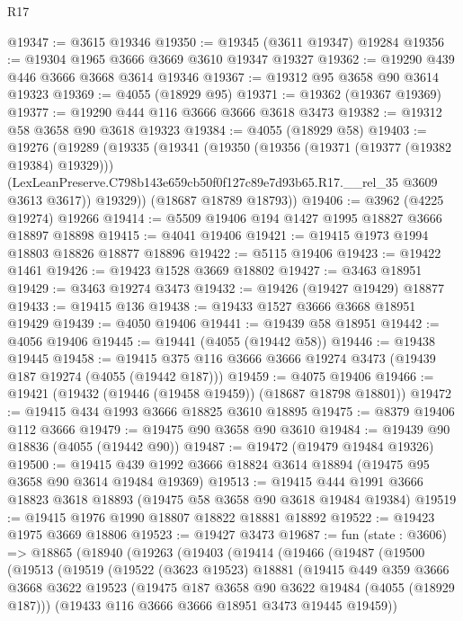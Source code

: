 \begin{lexlean}{R17}
\begin{coremodule}
@19347 := @3615 @19346
@19350 := @19345 (@3611 @19347) @19284
@19356 := @19304 @1965 @3666 @3669 @3610 @19347 @19327
@19362 := @19290 @439 @446 @3666 @3668 @3614 @19346
@19367 := @19312 @95 @3658 @90 @3614 @19323
@19369 := @4055 (@18929 @95)
@19371 := @19362 (@19367 @19369)
@19377 := @19290 @444 @116 @3666 @3666 @3618 @3473
@19382 := @19312 @58 @3658 @90 @3618 @19323
@19384 := @4055 (@18929 @58)
@19403 := @19276
    (@19289
      (@19335
        (@19341
          (@19350
            (@19356 (@19371 (@19377 (@19382 @19384) @19329)))
            (LexLeanPreserve.C798b143e659cb50f0f127c89e7d93b65.R17.__rel_35 @3609 @3613 @3617))
          @19329))
      (@18687 @18789 @18793))
@19406 := @3962 (@4225 @19274) @19266
@19414 := @5509 @19406 @194 @1427 @1995 @18827 @3666 @18897 @18898
@19415 := @4041 @19406
@19421 := @19415 @1973 @1994 @18803 @18826 @18877 @18896
@19422 := @5115 @19406
@19423 := @19422 @1461
@19426 := @19423 @1528 @3669 @18802
@19427 := @3463 @18951
@19429 := @3463 @19274 @3473
@19432 := @19426 (@19427 @19429) @18877
@19433 := @19415 @136
@19438 := @19433 @1527 @3666 @3668 @18951 @19429
@19439 := @4050 @19406
@19441 := @19439 @58 @18951
@19442 := @4056 @19406
@19445 := @19441 (@4055 (@19442 @58))
@19446 := @19438 @19445
@19458 := @19415 @375 @116 @3666 @3666 @19274 @3473 (@19439 @187 @19274 (@4055 (@19442 @187)))
@19459 := @4075 @19406
@19466 := @19421 (@19432 (@19446 (@19458 @19459)) (@18687 @18798 @18801))
@19472 := @19415 @434 @1993 @3666 @18825 @3610 @18895
@19475 := @8379 @19406 @112 @3666
@19479 := @19475 @90 @3658 @90 @3610
@19484 := @19439 @90 @18836 (@4055 (@19442 @90))
@19487 := @19472 (@19479 @19484 @19326)
@19500 := @19415 @439 @1992 @3666 @18824 @3614 @18894 (@19475 @95 @3658 @90 @3614 @19484 @19369)
@19513 := @19415 @444 @1991 @3666 @18823 @3618 @18893 (@19475 @58 @3658 @90 @3618 @19484 @19384)
@19519 := @19415 @1976 @1990 @18807 @18822 @18881 @18892
@19522 := @19423 @1975 @3669 @18806
@19523 := @19427 @3473
@19687 := fun (state : @3606) =>
  @18865
    (@18940
      (@19263
        (@19403
          (@19414
            (@19466
              (@19487
                (@19500
                  (@19513
                    (@19519
                      (@19522
                        (@3623 @19523)
                        @18881
                        (@19415
                          @449
                          @359
                          @3666
                          @3668
                          @3622
                          @19523
                          (@19475 @187 @3658 @90 @3622 @19484 (@4055 (@18929 @187)))
                          (@19433 @116 @3666 @3666 @18951 @3473 @19445 @19459))

\end{coremodule}
\end{lexlean}
